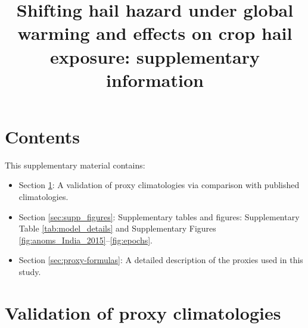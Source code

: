 \documentclass[pdflatex, sn-nature]{sn-jnl}\usepackage[]{graphicx}\usepackage[]{xcolor}
\begin{document}
\title{Shifting hail hazard under global warming and effects on crop hail exposure: supplementary information}

\author*[1,2,3,4]{ }
\author[5,6]{ }
\author[7]{ }
\author[2,3,4]{ }


\maketitle



\newpage
\section*{Contents}

This supplementary material contains:

\begin{itemize}
\item Section \ref{sec:proxy_validation}: A validation of proxy climatologies via comparison with published climatologies.
\item Section \ref{sec:supp_figures}: Supplementary tables and figures: Supplementary Table \ref{tab:model_details} and Supplementary Figures \ref{fig:anoms_India_2015}--\ref{fig:epochs}.
\item Section \ref{sec:proxy-formulas}: A detailed description of the proxies used in this study.
\end{itemize}

\section{Validation of proxy climatologies}
\label{sec:proxy_validation}
\end{document}
